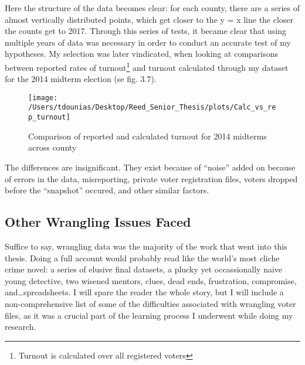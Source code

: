 \documentclass[12pt,twoside]{reedthesis}
\begin{document}
  Here the structure of the data becomes clear: for each county, there are
  a series of almost vertically distributed points, which get closer to
  the y = x line the closer the counts get to 2017. Through this series of
  tests, it became clear that using multiple years of data was necessary
  in order to conduct an accurate test of my hypotheses. My selection was
  later vindicated, when looking at comparisons between reported rates of
  turnout\footnote{Turnout is calculated over all registered voters} and
  turnout calculated through my dataset for the 2014 midterm election (se
  fig. 3.7).
  
  \begin{figure}
  
  {\centering \texttt{[image: /Users/tdounias/Desktop/Reed\_Senior\_Thesis/plots/Calc\_vs\_rep\_turnout]} 
  
  }
  
  \caption[Comparison of reported and calculated turnout for 2014 midterms across county]{Comparison of reported and calculated turnout for 2014 midterms across county}\label{fig:comp turnout 2014}
  \end{figure}
  
  The differences are insignificant. They exist because of ``noise'' added
  on because of errors in the data, misreporting, private voter
  registration files, voters dropped before the ``snapshot'' occured, and
  other similar factors.
  
  \subsection{Other Wrangling Issues
  Faced}\label{other-wrangling-issues-faced}
  
  Suffice to say, wrangling data was the majority of the work that went
  into this thesis. Doing a full account would probably read like the
  world's most cliche crime novel: a series of elusive final datasets, a
  plucky yet occassionally naive young detective, two wisened mentors,
  clues, dead ends, frustration, compromise, and\ldots{}spreadsheets. I
  will spare the reader the whole story, but I will include a
  non-comprehensive list of some of the difficulties associated with
  wrangling voter files, as it was a crucial part of the learning process
  I underwent while doing my research.
  
\end{document}
